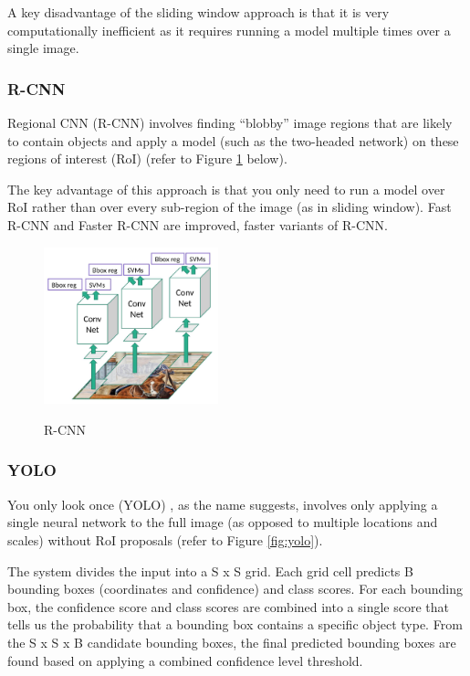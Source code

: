 \documentclass[twoside]{article}
\begin{document}
A key disadvantage of the sliding window approach is that it is very computationally inefficient as it requires running a model multiple times over a single image.

\subsubsection{R-CNN}

Regional CNN (R-CNN) involves finding “blobby” image regions that are likely to contain objects and apply a model (such as the two-headed network) on these regions of interest (RoI) (refer to Figure \ref{fig:r_cnn} below). 

The key advantage of this approach is that you only need to run a model over RoI rather than over every sub-region of the image (as in sliding window). Fast R-CNN and Faster R-CNN are improved, faster variants of R-CNN.

\begin{figure}[h!]
\centering
{\includegraphics[width=0.45\textwidth]{img/R-CNN.png}}
\caption{R-CNN}
\label{fig:r_cnn}
\end{figure}

\subsubsection{YOLO}

You only look once (YOLO) \cite{redmon2016you}, as the name suggests, involves only applying a single neural network to the full image (as opposed to multiple locations and scales) without RoI proposals (refer to Figure \ref{fig:yolo}). 

The system divides the input into a S x S grid. Each grid cell predicts B bounding boxes (coordinates and confidence) and class scores. For each bounding box, the confidence score and class scores are combined into a single score that tells us the probability that a bounding box contains a specific object type. From the S x S x B candidate bounding boxes, the final predicted bounding boxes are found based on applying a combined confidence level threshold.
\end{document}
